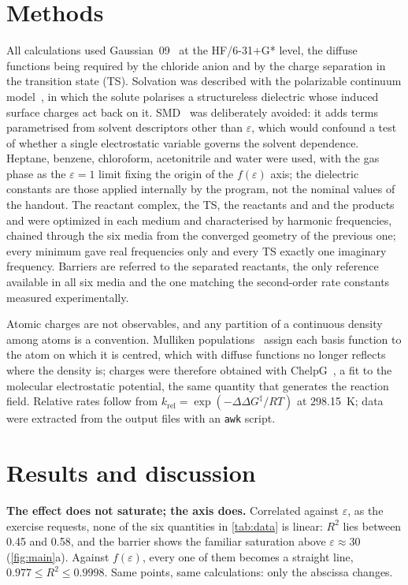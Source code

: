 \documentclass[10pt,a4paper]{article}
\begin{document}
\section{Methods}

All calculations used Gaussian~09~\cite{gaussian09} at the HF/6-31+G*
level, the diffuse functions being required by the chloride anion and by
the charge separation in the transition state (TS). Solvation was described
with the polarizable continuum model~\cite{Tomasi2005}, in which the solute
polarises a structureless dielectric whose induced surface charges act back
on it. SMD~\cite{Marenich2009} was deliberately avoided: it adds terms
parametrised from solvent descriptors other than $\varepsilon$, which would
confound a test of whether a single electrostatic variable governs the
solvent dependence. Heptane, benzene, chloroform, acetonitrile and water
were used, with the gas phase as the $\varepsilon = 1$ limit fixing the
origin of the $f(\varepsilon)$ axis; the dielectric constants are those
applied internally by the program, not the nominal values of the handout.
The reactant complex, the TS, the reactants  and  and the
products  and  were optimized in each medium and
characterised by harmonic frequencies, chained through the six media from
the converged geometry of the previous one; every minimum gave real
frequencies only and every TS exactly one imaginary frequency. Barriers are
referred to the separated reactants, the only reference available in all
six media and the one matching the second-order rate constants measured
experimentally.

Atomic charges are not observables, and any partition of a continuous
density among atoms is a convention. Mulliken populations~\cite{Mulliken1955}
assign each basis function to the atom on which it is centred, which with
diffuse functions no longer reflects where the density is; charges were
therefore obtained with ChelpG~\cite{Breneman1990}, a fit to the molecular
electrostatic potential, the same quantity that generates the reaction
field. Relative rates follow from
$k_\mathrm{rel} = \exp(-\Delta\Delta G^{\ddagger}/RT)$ at
\SI{298.15}{\kelvin}; data were extracted from the output files with an
\texttt{awk} script.

\section{Results and discussion}
\label{sec:results}

\textbf{The effect does not saturate; the axis does.} Correlated against
$\varepsilon$, as the exercise requests, none of the six quantities in
\cref{tab:data} is linear: $R^{2}$ lies between 0.45 and 0.58, and the
barrier shows the familiar saturation above $\varepsilon \approx 30$
(\cref{fig:main}a). Against $f(\varepsilon)$, every one of them becomes a
straight line, $0.977 \leq R^{2} \leq 0.9998$. Same points, same
calculations: only the abscissa changes.
\end{document}
